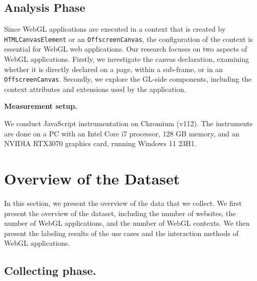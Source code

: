 


\subsection{Analysis Phase}

Since WebGL applications are executed in a context that is created by \texttt{HTMLCanvasElement} or an \texttt{OffscreenCanvas}, the configuration of the context is essential for WebGL web applications. Our research focuses on two aspects of WebGL applications. Firstly, we investigate the canvas declaration, examining whether it is directly declared on a page, within a sub-frame, or in an \texttt{OffscreenCanvas}. Secondly, we explore the GL-side components, including the context attributes and extensions used by the application. 

\textbf{Measurement setup.}

We conduct JavaScript instrumentation on Chromium (v112). The instruments are done on a PC with an Intel Core i7 processor, 128 GB memory, and an NVIDIA RTX3070 graphics card, running Windows 11 23H1.

\section{Overview of the Dataset}

In this section, we present the overview of the data that we collect. We first present the overview of the dataset, including the number of websites, the number of WebGL applications, and the number of WebGL contexts. We then present the labeling results of the use cases and the interaction methods of WebGL applications.

\subsection{Collecting phase.}

